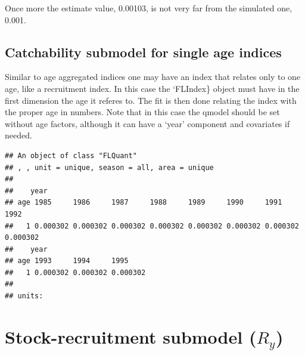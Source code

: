 \documentclass[
]{book}
\newenvironment{Shaded}{\begin{snugshade}}{\end{snugshade}}
\newcommand{\AttributeTok}[1]{\textcolor[rgb]{0.13,0.29,0.53}{#1}}
\newcommand{\CommentTok}[1]{\textcolor[rgb]{0.56,0.35,0.01}{\textit{#1}}}
\newcommand{\DecValTok}[1]{\textcolor[rgb]{0.00,0.00,0.81}{#1}}
\newcommand{\FunctionTok}[1]{\textcolor[rgb]{0.13,0.29,0.53}{\textbf{#1}}}
\newcommand{\NormalTok}[1]{#1}
\newcommand{\OtherTok}[1]{\textcolor[rgb]{0.56,0.35,0.01}{#1}}
\newcommand{\SpecialCharTok}[1]{\textcolor[rgb]{0.81,0.36,0.00}{\textbf{#1}}}
\begin{document}
Once more the estimate value, 0.00103, is not very far from the simulated one, 0.001.

\hypertarget{catchability-submodel-for-single-age-indices}{%
\subsection{Catchability submodel for single age indices}\label{catchability-submodel-for-single-age-indices}}

Similar to age aggregated indices one may have an index that relates only to one age, like a recruitment index. In this case the `FLIndex\} object must have in the first dimension the age it referes to. The fit is then done relating the index with the proper age in numbers. Note that in this case the qmodel should be set without age factors, although it can have a `year' component and covariates if needed.

\begin{Shaded}
\end{Shaded}

\begin{verbatim}
## An object of class "FLQuant"
## , , unit = unique, season = all, area = unique
## 
##    year
## age 1985     1986     1987     1988     1989     1990     1991     1992    
##   1 0.000302 0.000302 0.000302 0.000302 0.000302 0.000302 0.000302 0.000302
##    year
## age 1993     1994     1995    
##   1 0.000302 0.000302 0.000302
## 
## units:
\end{verbatim}

\hypertarget{stock-recruitment-submodel-r_y}{%
\section{\texorpdfstring{Stock-recruitment submodel (\(R_y\))}{Stock-recruitment submodel (R\_y)}}\label{stock-recruitment-submodel-r_y}}
\end{document}
